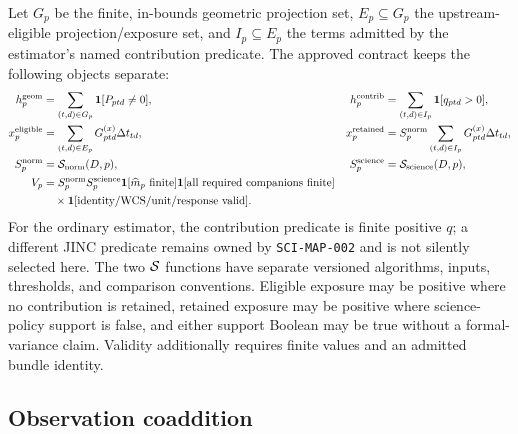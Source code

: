 \documentclass[11pt]{article}
\newcommand{\code}[1]{\nolinkurl{#1}}
\begin{document}
Let \(G_p\) be the finite, in-bounds geometric projection set, \(E_p\subseteq
G_p\) the upstream-eligible projection/exposure set, and \(I_p\subseteq E_p\)
the terms admitted by the estimator's named contribution predicate.  The
approved contract keeps the following objects separate:
\begin{align}
 h^{\rm geom}_p &= \sum_{(t,d)\in G_p}{\bf1}[P_{ptd}\ne0],
 &h^{\rm contrib}_p&=\sum_{(t,d)\in I_p}{\bf1}[q_{ptd}>0],
 \label{eq:audit-hits}\\
 x^{\rm eligible}_p &=
   \sum_{(t,d)\in E_p}G^{(x)}_{ptd}\Delta t_{td},
 &x^{\rm retained}_p&=S^{\rm norm}_p
   \sum_{(t,d)\in I_p}G^{(x)}_{ptd}\Delta t_{td},
 \label{eq:audit-coverage}\\
 S^{\rm norm}_p&={\cal S}_{\rm norm}(D,p),
 &S^{\rm science}_p&={\cal S}_{\rm science}(D,p),
 \label{eq:audit-support-axes}\\
 V_p &= S^{\rm norm}_p S^{\rm science}_p
       {\bf1}[\widehat m_p\text{ finite}]
       {\bf1}[\text{all required companions finite}]\nonumber\\
     &\quad{}\times{\bf1}[\text{identity/WCS/unit/response valid}].
 \label{eq:audit-validity}
\end{align}
For the ordinary estimator, the contribution predicate is finite positive
\(q\); a different JINC predicate remains owned by \code{SCI-MAP-002} and is
not silently selected here.  The two \({\cal S}\) functions have separate
versioned algorithms, inputs, thresholds, and comparison conventions.
Eligible exposure may be positive where no contribution is retained, retained
exposure may be positive where science-policy support is false, and either
support Boolean may be true without a formal-variance claim.  Validity
additionally requires finite values and an admitted bundle identity.

\subsection{Observation coaddition}
\end{document}
